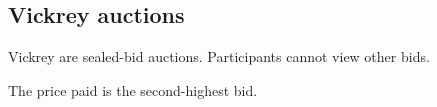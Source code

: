 
\subsection{Vickrey auctions}

Vickrey are sealed-bid auctions. Participants cannot view other bids.

The price paid is the second-highest bid.

